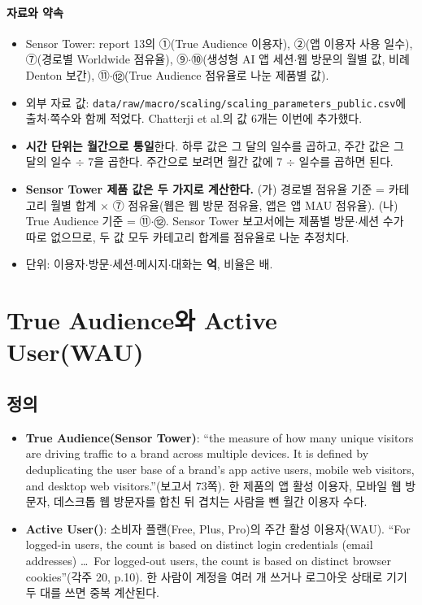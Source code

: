 \documentclass[11pt]{article}
\begin{document}
\paragraph{자료와 약속}
\begin{itemize}
  \item Sensor Tower: report 13의 ①(True Audience 이용자), ②(앱 이용자 사용 일수), ⑦(경로별 Worldwide 점유율), ⑨$\cdot$⑩(생성형 AI 앱 세션$\cdot$웹 방문의 월별 값, 비례 Denton 보간), ⑪$\cdot$⑫(True Audience 점유율로 나눈 제품별 값).
  \item 외부 자료 값: \texttt{data/raw/macro/scaling/scaling\_parameters\_public.csv}에 출처$\cdot$쪽수와 함께 적었다. Chatterji et al.의 값 6개는 이번에 추가했다.
  \item \textbf{시간 단위는 월간으로 통일}한다. 하루 값은 그 달의 일수를 곱하고, 주간 값은 그 달의 일수 $\div$ 7을 곱한다. 주간으로 보려면 월간 값에 7 $\div$ 일수를 곱하면 된다.
  \item \textbf{Sensor Tower 제품 값은 두 가지로 계산한다.} (가) 경로별 점유율 기준 = 카테고리 월별 합계 $\times$ ⑦ 점유율(웹은 웹 방문 점유율, 앱은 앱 MAU 점유율). (나) True Audience 기준 = ⑪$\cdot$⑫. Sensor Tower 보고서에는 제품별 방문$\cdot$세션 수가 따로 없으므로, 두 값 모두 카테고리 합계를 점유율로 나눈 추정치다.
  \item 단위: 이용자$\cdot$방문$\cdot$세션$\cdot$메시지$\cdot$대화는 \textbf{억}, 비율은 배.
\end{itemize}

\section{True Audience와 Active User(WAU)}

\subsection{정의}

\begin{itemize}
  \item \textbf{True Audience(Sensor Tower)}: ``the measure of how many unique visitors are driving traffic to a brand across multiple devices. It is defined by deduplicating the user base of a brand's app active users, mobile web visitors, and desktop web visitors.''(보고서 73쪽). 한 제품의 앱 활성 이용자, 모바일 웹 방문자, 데스크톱 웹 방문자를 합친 뒤 겹치는 사람을 뺀 월간 이용자 수다.
  \item \textbf{Active User(\citeauthor{chatterji-2025-how-people-use-chatgpt})}: 소비자 플랜(Free, Plus, Pro)의 주간 활성 이용자(WAU). ``For logged-in users, the count is based on distinct login credentials (email addresses) \ldots\ For logged-out users, the count is based on distinct browser cookies''(각주 20, p.10). 한 사람이 계정을 여러 개 쓰거나 로그아웃 상태로 기기 두 대를 쓰면 중복 계산된다.
\end{itemize}
\end{document}
